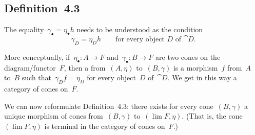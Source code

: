 \subsection{Definition~4.3}

The equality~$γ_\bullet = η_\bullet h$ needs to be understood as the condition
\[
	γ_D = η_D h
	\qquad
	\text{for every object~$D$ of~$\cat{D}$.}
\]

More conceptually, if~$η_\bullet \colon A \to F$ and~$γ_\bullet \colon B \to F$ are two cones on the diagram/functor~$F$, then a  from~$(A, η)$ to~$(B, γ)$ is a morphism~$f$ from~$A$ to~$B$ such that~$γ_D f = η_D$ for every object~$D$ of~$\cat{D}$.
We get in this way a category of cones on~$F$.

We can now reformulate Definition~4.3:
there exists for every cone~$(B, γ)$ a unique morphism of cones from~$(B, γ)$ to~$(\lim F, η)$.
(That is, the cone~$(\lim F, η)$ is terminal in the category of cones on~$F$.)
